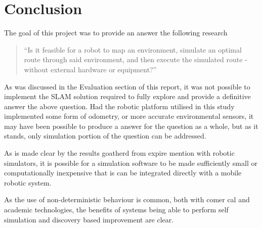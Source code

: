 \section{Conclusion}

The goal of this project was to provide an answer the following research
\begin{quote}
``Is it feasible for a robot to map an environment, simulate an optimal route
through said environment, and then execute the simulated route - without
external hardware or equipment?'' 
\end{quote}
As was discussed in the Evaluation section of this report, it was not possible
to implement the SLAM solution required to fully explore and provide a
definitive answer the above question.
Had the robotic platform utilised in this study implemented some form of
odometry, or more accurate environmental sensors, it may have been possible to
produce a answer for the question as a whole, but as it stands, only
simulation portion of the question can be addressed.


As is made clear by the results goatherd from expire mention with robotic
simulators, it is possible for a simulation software to be made sufficiently
small or computationally inexpensive that is can be integrated directly with a
mobile robotic system.



As the use of non-deterministic behaviour is common, both with comer cal
and academic technologies, the benefits of systems being able to perform self
simulation and discovery based improvement are clear.

